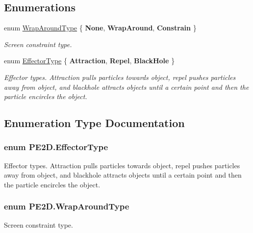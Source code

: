 \subsection*{Enumerations}
\begin{DoxyCompactItemize}
\item 
enum \hyperlink{namespace_p_e2_d_a510b407ed8d0de3476df258ab95e1e50}{Wrap\+Around\+Type} \{ {\bfseries None}, 
{\bfseries Wrap\+Around}, 
{\bfseries Constrain}
 \}\begin{DoxyCompactList}\small\item\em Screen constraint type. \end{DoxyCompactList}
\item 
enum \hyperlink{namespace_p_e2_d_a476bb8917ed61c9fea94f42486983a11}{Effector\+Type} \{ {\bfseries Attraction}, 
{\bfseries Repel}, 
{\bfseries Black\+Hole}
 \}\begin{DoxyCompactList}\small\item\em Effector types. Attraction pulls particles towards object, repel pushes particles away from object, and blackhole attracts objects until a certain point and then the particle encircles the object. \end{DoxyCompactList}
\end{DoxyCompactItemize}


\subsection{Enumeration Type Documentation}
\hypertarget{namespace_p_e2_d_a476bb8917ed61c9fea94f42486983a11}{}
\subsubsection[{Effector\+Type}]{\setlength{\rightskip}{0pt plus 5cm}enum {\bf P\+E2\+D.\+Effector\+Type}\hspace{0.3cm}{\ttfamily [strong]}}\label{namespace_p_e2_d_a476bb8917ed61c9fea94f42486983a11}


Effector types. Attraction pulls particles towards object, repel pushes particles away from object, and blackhole attracts objects until a certain point and then the particle encircles the object. 

\hypertarget{namespace_p_e2_d_a510b407ed8d0de3476df258ab95e1e50}{}
\subsubsection[{Wrap\+Around\+Type}]{\setlength{\rightskip}{0pt plus 5cm}enum {\bf P\+E2\+D.\+Wrap\+Around\+Type}\hspace{0.3cm}{\ttfamily [strong]}}\label{namespace_p_e2_d_a510b407ed8d0de3476df258ab95e1e50}


Screen constraint type. 

